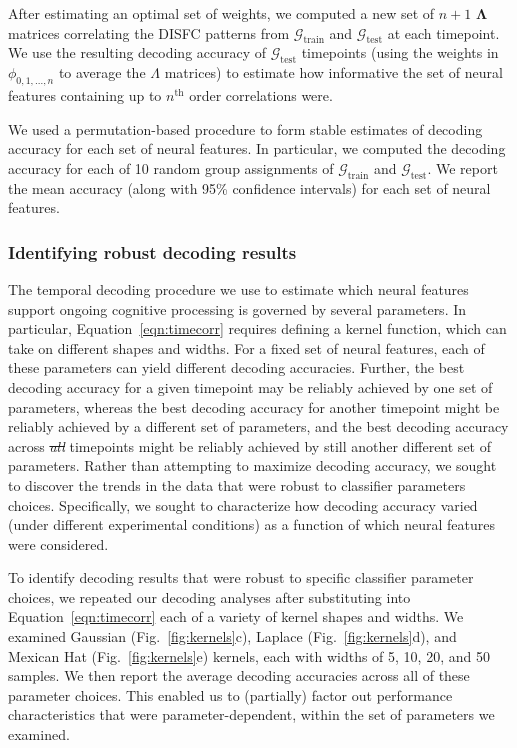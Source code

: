 \documentclass[english]{article}
\providecommand{\DIFaddtex}[1]{{\protect\color{blue}\uwave{#1}}} %
\providecommand{\DIFdeltex}[1]{{\protect\color{red}\sout{#1}}}                      %
\providecommand{\DIFaddbegin}{} %
\providecommand{\DIFaddend}{} %
\providecommand{\DIFdelbegin}{} %
\providecommand{\DIFdelend}{} %
\providecommand{\DIFadd}[1]{\texorpdfstring{\DIFaddtex{#1}}{#1}} %
\providecommand{\DIFdel}[1]{\texorpdfstring{\DIFdeltex{#1}}{}} %
\newcommand{\DIFscaledelfig}{0.5}
\newlength{\DIFdelgraphicswidth} %
\newlength{\DIFdelgraphicsheight} %
\newcommand{\DIFaddincludegraphics}[2][]{{\color{blue}\fbox{\DIFOincludegraphics[#1]{#2}}}} %
\newcommand{\DIFdelincludegraphics}[2][]{%
\sbox{\DIFdelgraphicsbox}{\DIFOincludegraphics[#1]{#2}}%
\settoboxwidth{\DIFdelgraphicswidth}{\DIFdelgraphicsbox} %
\settoboxtotalheight{\DIFdelgraphicsheight}{\DIFdelgraphicsbox} %
\scalebox{\DIFscaledelfig}{%
\parbox[b]{\DIFdelgraphicswidth}{\usebox{\DIFdelgraphicsbox}\\[-\baselineskip] \rule{\DIFdelgraphicswidth}{0em}}\llap{\resizebox{\DIFdelgraphicswidth}{\DIFdelgraphicsheight}{%
\setlength{\unitlength}{\DIFdelgraphicswidth}%
\begin{picture}(1,1)%
\thicklines\linethickness{2pt} %
{\color[rgb]{1,0,0}\put(0,0){\framebox(1,1){}}}%
{\color[rgb]{1,0,0}\put(0,0){\line( 1,1){1}}}%
{\color[rgb]{1,0,0}\put(0,1){\line(1,-1){1}}}%
\end{picture}%
}\hspace*{3pt}}} %
} %
\DeclareRobustCommand{\DIFaddbegin}{\DIFOaddbegin \let\includegraphics\DIFaddincludegraphics} %
\DeclareRobustCommand{\DIFaddend}{\DIFOaddend \let\includegraphics\DIFOincludegraphics} %
\DeclareRobustCommand{\DIFdelbegin}{\DIFOdelbegin \let\includegraphics\DIFdelincludegraphics} %
\DeclareRobustCommand{\DIFdelend}{\DIFOaddend \let\includegraphics\DIFOincludegraphics} %
\begin{document}
After estimating an optimal set of weights, we computed a new set of
$n + 1$ $\mathbf{\Lambda}$ matrices correlating the DISFC patterns
from $\mathcal{G}_{\mathrm{train}}$ and $\mathcal{G}_{\mathrm{test}}$
at each timepoint.  We use the resulting decoding accuracy of
$\mathcal{G}_{\mathrm{test}}$ timepoints (using the weights in
$\phi_{0, 1, ..., n}$ to average the $\Lambda$ matrices) to estimate how informative
the set of neural features containing up to $n^\mathrm{th}$ order
correlations were.

We used a permutation-based procedure to form stable estimates of
decoding accuracy for each set of neural features.  In particular, we
computed the decoding accuracy for each of 10 random group assignments of
$\mathcal{G}_{\mathrm{train}}$ and $\mathcal{G}_{\mathrm{test}}$.  We
report the mean accuracy (along with 95\% confidence intervals) for each set
of neural features.


\subsubsection*{Identifying robust decoding results}
The temporal decoding procedure we use to estimate which neural
features support ongoing cognitive processing is governed by several
parameters. In particular, Equation~\ref{eqn:timecorr} requires
defining a kernel function, which can take on different shapes and
widths.  For a fixed set of neural features, each of these parameters
can yield different decoding accuracies.  Further, the best decoding
accuracy for a given timepoint may be reliably achieved by one set of
parameters, whereas the best decoding accuracy for another timepoint
might be reliably achieved by a different set of parameters, and the
best decoding accuracy across \DIFdelbegin \textit{\DIFdel{all}} %
\DIFdelend \DIFaddbegin \DIFadd{all }\DIFaddend timepoints might be
reliably achieved by still another different set of parameters.
Rather than attempting to maximize decoding accuracy, we sought to
discover the trends in the data that were robust to classifier
parameters choices.  Specifically, we sought to characterize how
decoding accuracy varied (under different experimental conditions) as
a function of which neural features were considered.

To identify decoding results that were robust to specific classifier
parameter choices, we repeated our decoding analyses after
substituting into Equation~\ref{eqn:timecorr} each of a variety of
kernel shapes and widths.  We examined Gaussian
(Fig.~\ref{fig:kernels}c), Laplace (Fig.~\ref{fig:kernels}d), and
Mexican Hat (Fig.~\ref{fig:kernels}e) kernels, each with widths of 5,
10, 20, and 50 samples.  We then report the average decoding
accuracies across all of these parameter choices.  This enabled us to
(partially) factor out performance characteristics that were
parameter-dependent, within the set of parameters we examined.
\end{document}
